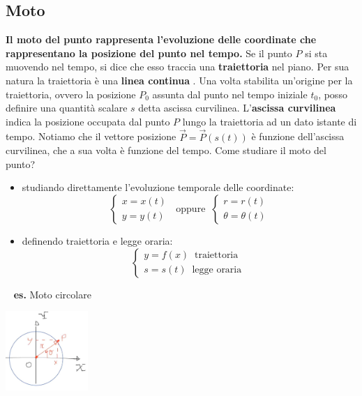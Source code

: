 \subsection{Moto}
\textbf{Il moto del punto rappresenta l'evoluzione delle coordinate che rappresentano la posizione del punto nel tempo.} Se il punto $P$ si sta muovendo nel tempo, si dice che esso traccia una \textbf{traiettoria} nel piano. Per sua natura la traiettoria è una \textbf{linea continua }.\newline
\newline
Una volta stabilita un'origine per la traiettoria, ovvero la posizione $P_0$ assunta dal punto nel tempo iniziale $t_0$, posso definire una quantità scalare $s$ detta ascissa curvilinea. L'\textbf{ascissa curvilinea} indica la posizione occupata dal punto $P$ lungo la traiettoria ad un dato istante di tempo.\newline
Notiamo che il vettore posizione $\vec{P} = \vec{P}(s(t))$ è funzione dell'ascissa curvilinea, che a sua volta è funzione del tempo.\newline
\newline
Come studiare il moto del punto?
\begin{itemize}
    \item studiando direttamente l'evoluzione temporale delle coordinate:
    \[
        \begin{cases}
            x = x(t)\\
            y = y(t)
        \end{cases} \;\;\text{oppure}\;\;\begin{cases}
            r = r(t)\\
            \theta = \theta(t)
        \end{cases}
    \]
    \item definendo traiettoria e legge oraria:\[
        \begin{cases}
            y=f(x) \;\; \text{traiettoria}\;\\
            s = s(t) \;\; \text{legge oraria}\;
        \end{cases}
    \]
\end{itemize}
\ \newline
\textbf{es.} Moto circolare 
\begin{center}
    \includegraphics[height=3cm]{../lezione1/img1.JPG}
\end{center}
